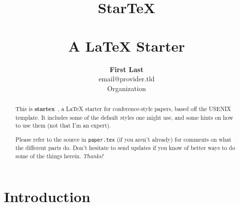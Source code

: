 \documentclass[letterpaper,twocolumn,10pt,final]{article}
\begin{document}
\date{}

\title{\selectfont
    {\huge{\textbf{StarTeX}}}\\
    {\large{\textbf{\\A LaTeX Starter}}}}


\author{
{\rm \textbf{First Last}}\\
{\rm email@provider.tld}\\
Organization\\
} %

\maketitle

\thispagestyle{empty}

\begin{abstract}
This is \textbf{startex}~\cite{startex}, a LaTeX starter for conference-style papers, based off the USENIX template. It includes some of the default styles one might use, and some hints on how to use them (not that I'm an expert).

Please refer to the source in \texttt{paper.tex} (if you aren't already) for comments on what the different parts do. Don't hesitate to send updates if you know of better ways to do some of the things herein. \textit{Thanks!}
\end{abstract}

\section{\label{sec:intro}Introduction}

\end{document}
